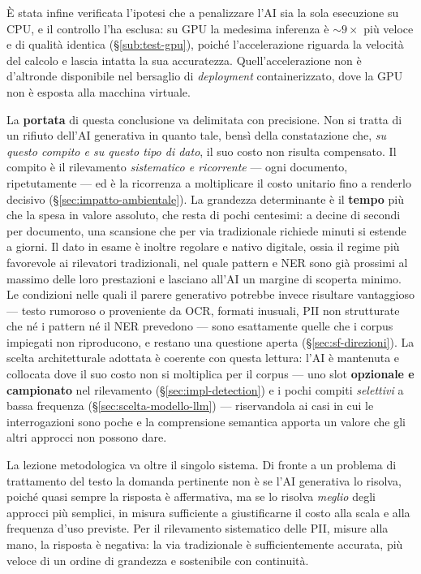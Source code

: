 È stata infine verificata l'ipotesi che a penalizzare l'AI sia la sola esecuzione su CPU, e il controllo l'ha esclusa: su GPU la medesima inferenza è ${\sim}9\times$ più veloce e di qualità identica (§\ref{sub:test-gpu}), poiché l'accelerazione riguarda la velocità del calcolo e lascia intatta la sua accuratezza. Quell'accelerazione non è d'altronde disponibile nel bersaglio di \textit{deployment} containerizzato, dove la GPU non è esposta alla macchina virtuale.

La \textbf{portata} di questa conclusione va delimitata con precisione. Non si tratta di un rifiuto dell'AI generativa in quanto tale, bensì della constatazione che, \emph{su questo compito e su questo tipo di dato}, il suo costo non risulta compensato. Il compito è il rilevamento \emph{sistematico e ricorrente} --- ogni documento, ripetutamente --- ed è la ricorrenza a moltiplicare il costo unitario fino a renderlo decisivo (§\ref{sec:impatto-ambientale}). La grandezza determinante è il \textbf{tempo} più che la spesa in valore assoluto, che resta di pochi centesimi: a decine di secondi per documento, una scansione che per via tradizionale richiede minuti si estende a giorni. Il dato in esame è inoltre regolare e nativo digitale, ossia il regime più favorevole ai rilevatori tradizionali, nel quale pattern e NER sono già prossimi al massimo delle loro prestazioni e lasciano all'AI un margine di scoperta minimo. Le condizioni nelle quali il parere generativo potrebbe invece risultare vantaggioso --- testo rumoroso o proveniente da OCR, formati inusuali, PII non strutturate che né i pattern né il NER prevedono --- sono esattamente quelle che i corpus impiegati non riproducono, e restano una questione aperta (§\ref{sec:sf-direzioni}). La scelta architetturale adottata è coerente con questa lettura: l'AI è mantenuta e collocata dove il suo costo non si moltiplica per il corpus --- uno slot \textbf{opzionale e campionato} nel rilevamento (§\ref{sec:impl-detection}) e i pochi compiti \emph{selettivi} a bassa frequenza (§\ref{sec:scelta-modello-llm}) --- riservandola ai casi in cui le interrogazioni sono poche e la comprensione semantica apporta un valore che gli altri approcci non possono dare.

La lezione metodologica va oltre il singolo sistema. Di fronte a un problema di trattamento del testo la domanda pertinente non è se l'AI generativa lo risolva, poiché quasi sempre la risposta è affermativa, ma se lo risolva \emph{meglio} degli approcci più semplici, in misura sufficiente a giustificarne il costo alla scala e alla frequenza d'uso previste. Per il rilevamento sistematico delle PII, misure alla mano, la risposta è negativa: la via tradizionale è sufficientemente accurata, più veloce di un ordine di grandezza e sostenibile con continuità.

